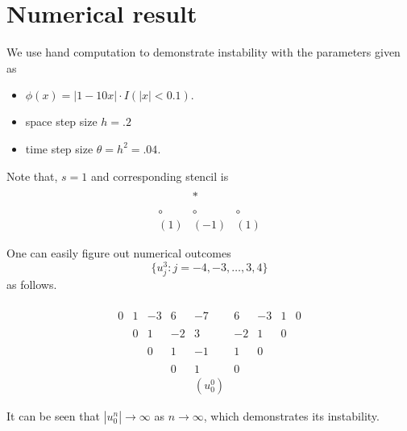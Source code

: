 \documentclass{article}
\begin{document}
\section{Numerical result}
We use hand computation to demonstrate instability with the parameters given as
\begin{itemize}
 \item $\phi(x) = |1 - 10 x| \cdot I (|x| <0.1).$
 \item space step size $h = .2$
 \item time step size $\theta = h^2 = .04$.
\end{itemize}

Note that, $s =1$ and corresponding stencil is
$$
\begin{array}
 {ccc}
 \\
 & * & 
 \\
 \\
 \circ  & \circ & \circ
 \\
(1) &  (-1) &  (1)
\end{array}
$$


One can easily figure out numerical outcomes 
$$\{u^{3}_{j}: j = -4, -3, \ldots, 3, 4\}$$
as follows.


$$
\begin{array}
 {ccccccccc}
 \\
 0 & 1 & -3 & 6 & -7 & 6 & -3 & 1 & 0
 \\
 \\
 & 0 & 1 & -2 & 3 & -2 & 1& 0 & 
 \\
 \\
 && 0 & 1 & -1 & 1 & 0
 \\
 \\
&&& 0 & 1 & 0
\\
&&&& (u_{0}^{0})
\end{array}
$$

It can be seen that $|u_{0}^{n}| \to \infty$ as $n\to \infty$, which demonstrates its instability.
\end{document}
